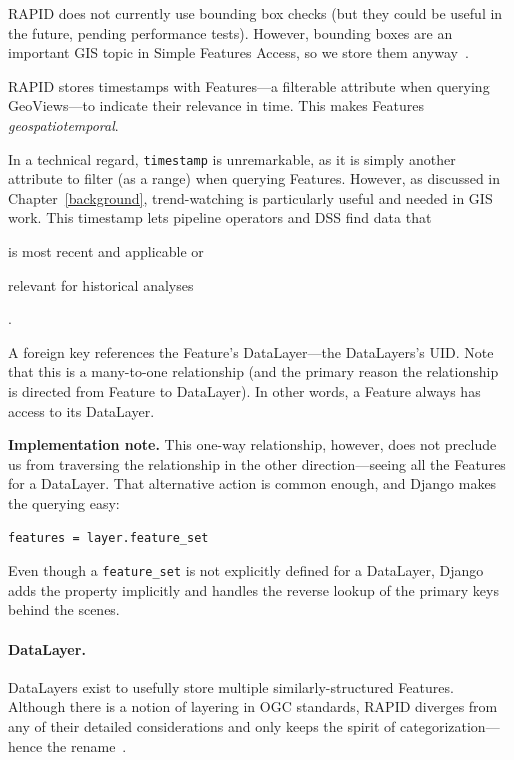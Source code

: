 \begin{description}
  RAPID does not currently use bounding box checks (but they could be useful in the future, pending performance tests). However, bounding boxes are an important GIS topic in Simple Features Access, so we store them anyway~\cite{SFA}.
  
\item[Timestamp.] 
RAPID stores timestamps with Features---a filterable attribute when querying GeoViews---to indicate their relevance in time. This makes Features \textit{geospatiotemporal}.

In a technical regard, \texttt{timestamp} is unremarkable, as it is simply another attribute to filter (as a range) when querying Features. However, as discussed in Chapter~\ref{background}, trend-watching is particularly useful and needed in GIS work. This timestamp lets pipeline operators and DSS find data that \begin{enumerate*}[label=\itshape\alph*\upshape)]
\item is most recent and applicable or
\item relevant for historical analyses
\end{enumerate*}.
  
\item[DataLayer foreign key.] 
A foreign key references the Feature's DataLayer---the DataLayers's UID. Note that this is a many-to-one relationship (and the primary reason the relationship is directed from Feature to DataLayer). In other words, a Feature always has access to its DataLayer.

\textbf{Implementation note.} This one-way relationship, however, does not preclude us from traversing the relationship in the other direction---seeing all the Features for a DataLayer. That alternative action is common enough, and Django makes the querying easy: 

\begin{Verbatim}[samepage=true,baselinestretch=1,xleftmargin=12mm]
features = layer.feature_set
\end{Verbatim}

Even though a \texttt{feature\_set} is not explicitly defined for a DataLayer, Django adds the property implicitly and handles the reverse lookup of the primary keys behind the scenes.

\end{description}

\paragraph{DataLayer.}
DataLayers exist to usefully store multiple similarly-structured Features. Although there is a notion of layering in OGC standards, RAPID diverges from any of their detailed considerations and only keeps the spirit of categorization---hence the rename~\cite{AbstractSpecFaq,SFA,WFS}.

